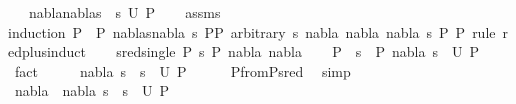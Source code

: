 \begin{isabellebody}
\ \ \ {\isachardoublequoteopen}{\isacharparenleft}{\kern0pt}nabla{}{\isasymunion}nabla{}{\isacharcomma}{\kern0pt}{\isacharparenleft}{\kern0pt}s{}\ {\isasymbullet}\ s{\isacharparenright}{\kern0pt}{\isacharparenright}{\kern0pt}{\isasymin}\ U\ P{}{\isachardoublequoteclose}\isanewline
%
\isadelimproof
\ \ %
\endisadelimproof
%
\isatagproof
{}\isamarkupfalse%
\ assms\isanewline
{}\isamarkupfalse%
{\isacharparenleft}{\kern0pt}induction\ P{}\ {\isasymequiv}\ {\isachardoublequoteopen}P{}{\isachardoublequoteclose}\ nablas{\isasymequiv}{\isachardoublequoteopen}{\isacharparenleft}{\kern0pt}nabla{\isacharcomma}{\kern0pt}\ s{\isacharparenright}{\kern0pt}{\isachardoublequoteclose}\ P{}{\isasymequiv}{\isachardoublequoteopen}P{}{\isachardoublequoteclose}\ arbitrary{\isacharcolon}{\kern0pt}\ s\ nabla{}\ nabla\ nabla{}\ s{}\ P{}\ P{}\ rule{\isacharcolon}{\kern0pt}\ red{\isacharunderscore}{\kern0pt}plus{\isachardot}{\kern0pt}induct{\isacharparenright}{\kern0pt}\isanewline
\ \ \isamarkupfalse%
\ {\isacharparenleft}{\kern0pt}sred{\isacharunderscore}{\kern0pt}single\ P{}\ s\ P{}\ nabla{}\ nabla{}{\isacharparenright}{\kern0pt}\isanewline
\ \ \isamarkupfalse%
\ {\isachardoublequoteopen}P{}\ {\isasymturnstile}\ s\ {\isasymleadsto}\ P{}{\isachardoublequoteclose}\ {\isachardoublequoteopen}{\isacharparenleft}{\kern0pt}nabla{}{\isacharcomma}{\kern0pt}\ s{}{\isacharparenright}{\kern0pt}\ {\isasymin}\ U\ P{}{\isachardoublequoteclose}\ \isamarkupfalse%
\ fact{\isacharplus}{\kern0pt}\isanewline
\ \ \isamarkupfalse%
\ \isamarkupfalse%
\ {\isachardoublequoteopen}{\isacharparenleft}{\kern0pt}nabla{}{\isacharcomma}{\kern0pt}\ s{}\ {\isasymbullet}\ s{\isacharparenright}{\kern0pt}\ {\isasymin}\ U\ P{}{\isachardoublequoteclose}\isanewline
\ \ \ \ \isamarkupfalse%
\ P{}{\isacharunderscore}{\kern0pt}from{\isacharunderscore}{\kern0pt}P{}{\isacharunderscore}{\kern0pt}sred\ \isamarkupfalse%
\ simp\isanewline
\ \ \isamarkupfalse%
\ \isamarkupfalse%
\ {\isachardoublequoteopen}{\isacharparenleft}{\kern0pt}nabla{}\ {\isasymunion}\ nabla{}{\isacharcomma}{\kern0pt}\ s{}\ {\isasymbullet}\ s{\isacharparenright}{\kern0pt}\ {\isasymin}\ U\ P{}{\isachardoublequoteclose}\isanewline

\end{isabellebody}
